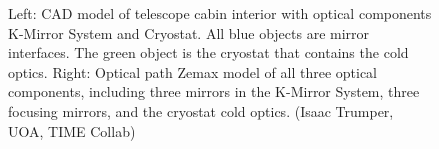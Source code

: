 \documentclass[manuscript]{aastex}
\begin{document}
\begin{figure}[H]%
    \centering
    \qquad
    \singlespace
    \caption[TIME Full Optical Path in Telescope Cabin -(Isaac Trumper, UOA, TIME Collab)]{Left: CAD model of telescope cabin interior with optical components K-Mirror System and Cryostat. All blue objects are mirror interfaces. The green object is the cryostat that contains the cold optics. Right: Optical path {\sc Zemax} model of all three optical components, including three mirrors in the K-Mirror System, three focusing mirrors, and the cryostat cold optics. (Isaac Trumper, UOA, TIME Collab)}%
    \label{fig:optpath}%
    \vspace{-0.8cm}
\end{figure}


\end{document}
